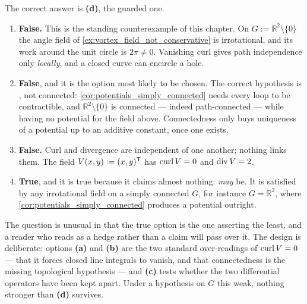 \begin{exercisesolution}
\label{sol:kobel_irrotational_single_choice}
The correct answer is \textbf{(d)}, the guarded one.
\begin{enumerate}[label=\textbf{(\alph*)}]
  \item \textbf{False.} This is the standing counterexample of this chapter. On
    $G := \mathbb{R}^2\setminus\{0\}$ the angle field of
    \cref{ex:vortex_field_not_conservative} is irrotational, and its work around the unit circle
    is $2\pi \neq 0$. Vanishing curl gives path independence only \emph{locally}, and a closed
    curve can encircle a hole.
  \item \textbf{False}, and it is the option most likely to be chosen. The correct hypothesis is
    , not connected: \cref{cor:potentials_simply_connected} needs every
    loop to be contractible, and $\mathbb{R}^2\setminus\{0\}$ is connected --- indeed
    path-connected --- while having no potential for the field above. Connectedness only buys
    uniqueness of a potential up to an additive constant, once one exists.
  \item \textbf{False.} Curl and divergence are independent of one another; nothing links them. The
    field $V(x,y) := (x,y)^{\mathsf{T}}$ has $\operatorname{curl} V = 0$ and $\operatorname{div} V = 2$.
  \item \textbf{True}, and it is true because it claims almost nothing: \emph{may} be. It is
    satisfied by any irrotational field on a simply connected $G$, for instance $G =
    \mathbb{R}^2$, where \cref{cor:potentials_simply_connected} produces a potential outright.
\end{enumerate}
\begin{remark}
\label{rem:irrotational_weakest_true_statement}
The question is unusual in that the true option is the one asserting the least, and a reader who
reads  as a hedge rather than a claim will pass over it. The design is
deliberate: options \textbf{(a)} and \textbf{(b)} are the two standard over-readings of
$\operatorname{curl} V = 0$ --- that it forces closed line integrals to vanish, and that connectedness is the
missing topological hypothesis --- and \textbf{(c)} tests whether the two differential operators
have been kept apart. Under a hypothesis on $G$ this weak, nothing stronger than \textbf{(d)}
survives.
\end{remark}
\end{exercisesolution}

